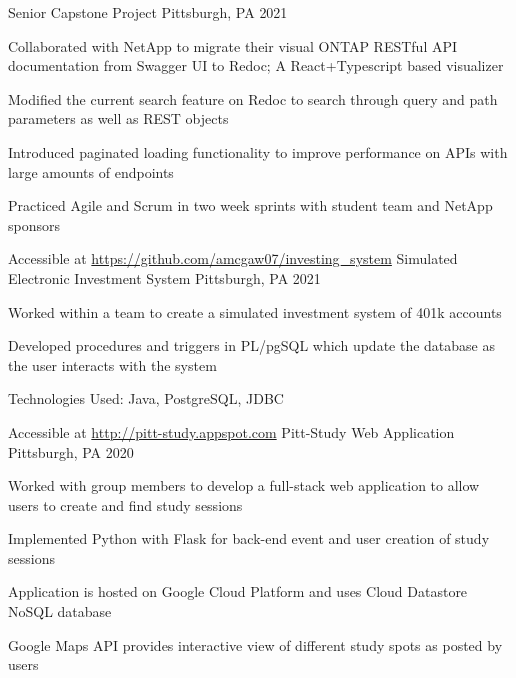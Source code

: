 \documentclass[]{awesome-cv}
\begin{document}
\vspace{-11mm}
\begin{cventries}
\cventry
	{}
	{Senior Capstone Project}
	{Pittsburgh, PA}
	{2021}
	{\begin{cvitems}
		\item {Collaborated with NetApp to migrate their visual ONTAP RESTful API documentation from Swagger UI to Redoc; A React+Typescript based visualizer}
		\item {Modified the current search feature on Redoc to search through query and path parameters as well as REST objects}
		\item {Introduced paginated loading functionality to improve performance on APIs with large amounts of endpoints}
		\item {Practiced Agile and Scrum in two week sprints with student team and NetApp sponsors }
		\end{cvitems}}
	\cventry
	{Accessible at \href{https://github.com/amcgaw07/investing_system} {https://github.com/amcgaw07/investing\_system}}
	{Simulated Electronic Investment System}
	{Pittsburgh, PA}
	{2021}
	{\begin{cvitems}
		\item {Worked within a team to create a simulated investment system of 401k accounts}
		\item {Developed procedures and triggers in PL/pgSQL which update the database as the user interacts with the system}
		\item {Technologies Used: Java, PostgreSQL, JDBC}
		\end{cvitems}}
	\cventry	
	{Accessible at \href{http://pitt-study.appspot.com} {http://pitt-study.appspot.com}}
	{Pitt-Study Web Application}
	{Pittsburgh, PA}
	{2020}
	{\begin{cvitems}
		\item {Worked with group members to develop a full-stack web application to allow users to create and find study sessions}
		\item {Implemented Python with Flask for back-end event and user creation of study sessions}
		\item {Application is hosted on Google Cloud Platform and uses Cloud Datastore NoSQL database}
		\item {Google Maps API provides interactive view of different study spots as posted by users}
		\end{cvitems}}

\end{cventries}
\end{document}
